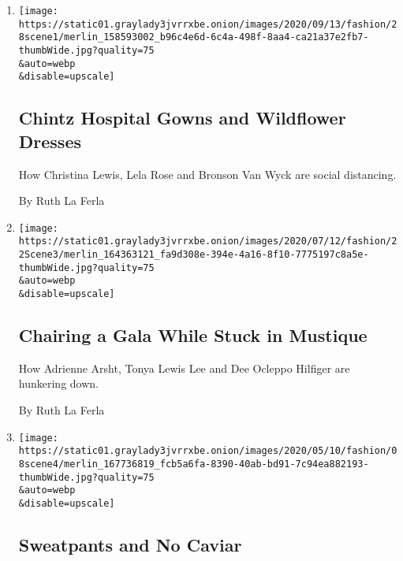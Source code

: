 \begin{enumerate}
\def\labelenumi{\arabic{enumi}.}
\item
  \href{/2020/08/28/style/chintz-hospital-gowns-and-wildflower-dresses.html}{}

  \texttt{[image: https://static01.graylady3jvrrxbe.onion/images/2020/09/13/fashion/28scene1/merlin\_158593002\_b96c4e6d-6c4a-498f-8aa4-ca21a37e2fb7-thumbWide.jpg?quality=75\\\&auto=webp\\\&disable=upscale]}

  \hypertarget{chintz-hospital-gowns-and-wildflower-dresses}{%
  \subsection{Chintz Hospital Gowns and Wildflower
  Dresses}\label{chintz-hospital-gowns-and-wildflower-dresses}}

  How Christina Lewis, Lela Rose and Bronson Van Wyck are social
  distancing.

  By Ruth La Ferla
\item
  \href{/2020/05/25/style/chairing-a-gala-while-stuck-in-mustique.html}{}

  \texttt{[image: https://static01.graylady3jvrrxbe.onion/images/2020/07/12/fashion/22Scene3/merlin\_164363121\_fa9d308e-394e-4a16-8f10-7775197c8a5e-thumbWide.jpg?quality=75\\\&auto=webp\\\&disable=upscale]}

  \hypertarget{chairing-a-gala-while-stuck-in-mustique}{%
  \subsection{Chairing a Gala While Stuck in
  Mustique}\label{chairing-a-gala-while-stuck-in-mustique}}

  How Adrienne Arsht, Tonya Lewis Lee and Dee Ocleppo Hilfiger are
  hunkering down.

  By Ruth La Ferla
\item
  \href{/2020/05/08/style/sweatpants-and-no-caviar.html}{}

  \texttt{[image: https://static01.graylady3jvrrxbe.onion/images/2020/05/10/fashion/08scene4/merlin\_167736819\_fcb5a6fa-8390-40ab-bd91-7c94ea882193-thumbWide.jpg?quality=75\\\&auto=webp\\\&disable=upscale]}

  \hypertarget{sweatpants-and-no-caviar}{%
  \subsection{Sweatpants and No Caviar}\label{sweatpants-and-no-caviar}}


\end{enumerate}
